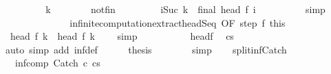 \begin{isabellebody}
\ \isanewline
\ \ \ \ \ \ \isamarkupfalse%
\ k\isanewline
\ \ \ \ \ \ \isamarkupfalse%
\ not{\isacharunderscore}fin\ \isanewline
\ \ \ \ \ \ \isamarkupfalse%
\ {\isachardoublequoteopen}{\isasymforall}i{\isacharless}{\isacharparenleft}Suc\ k{\isacharparenright}{\isachardot}\ {\isasymnot}\ final\ {\isacharparenleft}head\ {\isacharparenleft}f\ i{\isacharparenright}{\isacharparenright}{\isachardoublequoteclose}\isanewline
\ \ \ \ \ \ \ \ \isamarkupfalse%
\ simp\isanewline
\ \ \ \ \ \ \isanewline
\ \ \ \ \ \ \isamarkupfalse%
\ infinite{\isacharunderscore}computation{\isacharunderscore}extract{\isacharunderscore}head{\isacharunderscore}Seq\ {\isacharbrackleft}OF\ step\ f{\isacharunderscore}{}\ this\ {\isacharbrackright}\isanewline
\ \ \ \ \ \ \isamarkupfalse%
\ {\isachardoublequoteopen}{\isasymGamma}{\isasymturnstile}\ head\ {\isacharparenleft}f\ k{\isacharparenright}\ {\isasymrightarrow}\ head\ {\isacharparenleft}f\ {\isacharparenleft}k\ {\isacharplus}\ {}{\isacharparenright}{\isacharparenright}{\isachardoublequoteclose}\ \isamarkupfalse%
\ simp\isanewline
\ \ \ \ \isamarkupfalse%
\isanewline
\ \ \ \ \isamarkupfalse%
\ head{\isacharunderscore}f{\isacharunderscore}{}\ \isamarkupfalse%
\ {\isachardoublequoteopen}{\isasymGamma}{\isasymturnstile}{\isacharparenleft}cs{\isacharparenright}\ {\isasymrightarrow}\ {\isasymdots}{\isacharparenleft}{\isasyminfinity}{\isacharparenright}{\isachardoublequoteclose}\isanewline
\ \ \ \ \ \ \isamarkupfalse%
\ {\isacharparenleft}auto\ simp\ add{\isacharcolon}\ inf{\isacharunderscore}def{\isacharparenright}\isanewline
\ \ \ \ \isamarkupfalse%
\ {\isacharquery}thesis\isanewline
\ \ \ \ \ \ \isamarkupfalse%
\ simp\isanewline
\ \ \isamarkupfalse%
\isanewline
{}\isamarkupfalse%
%
\endisatagproof
{\isafoldproof}%
%
\isadelimproof
\isanewline
%
\endisadelimproof
\isanewline
{}\isamarkupfalse%
\ split{\isacharunderscore}inf{\isacharunderscore}Catch{\isacharcolon}\ \isanewline
\ \ \ inf{\isacharunderscore}comp{\isacharcolon}\ {\isachardoublequoteopen}{\isasymGamma}{\isasymturnstile}{\isacharparenleft}Catch\ c\ cs{\isacharparenright}\ {\isasymrightarrow}\ {\isasymdots}{\isacharparenleft}{\isasyminfinity}{\isacharparenright}{\isachardoublequoteclose}\isanewline

\end{isabellebody}
